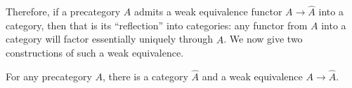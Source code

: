 \documentclass[hott-all.tex]{subfiles}
\begin{document}
%
%

%
Therefore, if a precategory $A$ admits a weak equivalence functor $A\to \widehat{A}$ into a category, then that is its ``reflection'' into categories: any functor from $A$ into a category will factor essentially uniquely through $\widehat{A}$.
We now give two constructions of such a weak equivalence.

%
%

\begin{thm}
  For any precategory $A$, there is a category $\widehat A$ and a weak equivalence $A\to\widehat{A}$.
\end{thm}

%
\end{document}
